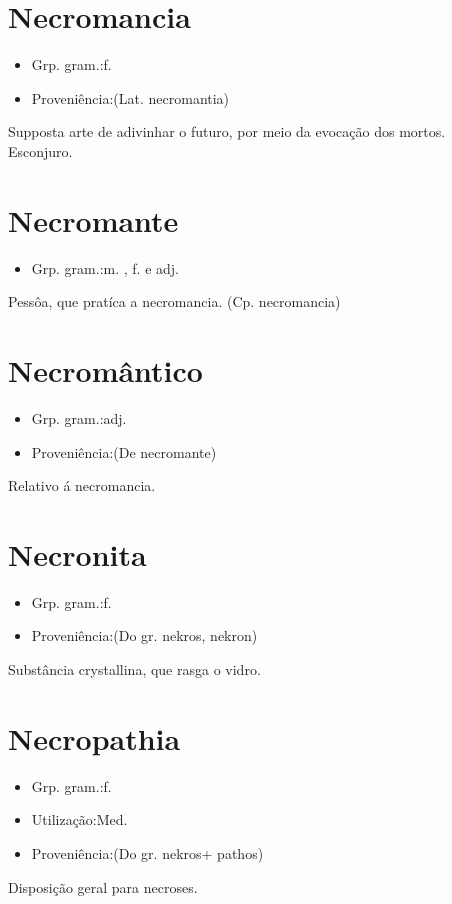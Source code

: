 \section{Necromancia}
\begin{itemize}
\item {Grp. gram.:f.}
\end{itemize}
\begin{itemize}
\item {Proveniência:(Lat. \textunderscore necromantia\textunderscore )}
\end{itemize}
Supposta arte de adivinhar o futuro, por meio da evocação dos mortos.
Esconjuro.
\section{Necromante}
\begin{itemize}
\item {Grp. gram.:m. ,  f.  e  adj.}
\end{itemize}
Pessôa, que pratíca a necromancia.
(Cp. \textunderscore necromancia\textunderscore )
\section{Necromântico}
\begin{itemize}
\item {Grp. gram.:adj.}
\end{itemize}
\begin{itemize}
\item {Proveniência:(De \textunderscore necromante\textunderscore )}
\end{itemize}
Relativo á necromancia.
\section{Necronita}
\begin{itemize}
\item {Grp. gram.:f.}
\end{itemize}
\begin{itemize}
\item {Proveniência:(Do gr. \textunderscore nekros\textunderscore , \textunderscore nekron\textunderscore )}
\end{itemize}
Substância crystallina, que rasga o vidro.
\section{Necropathia}
\begin{itemize}
\item {Grp. gram.:f.}
\end{itemize}
\begin{itemize}
\item {Utilização:Med.}
\end{itemize}
\begin{itemize}
\item {Proveniência:(Do gr. \textunderscore nekros\textunderscore  + \textunderscore pathos\textunderscore )}
\end{itemize}
Disposição geral para necroses.
